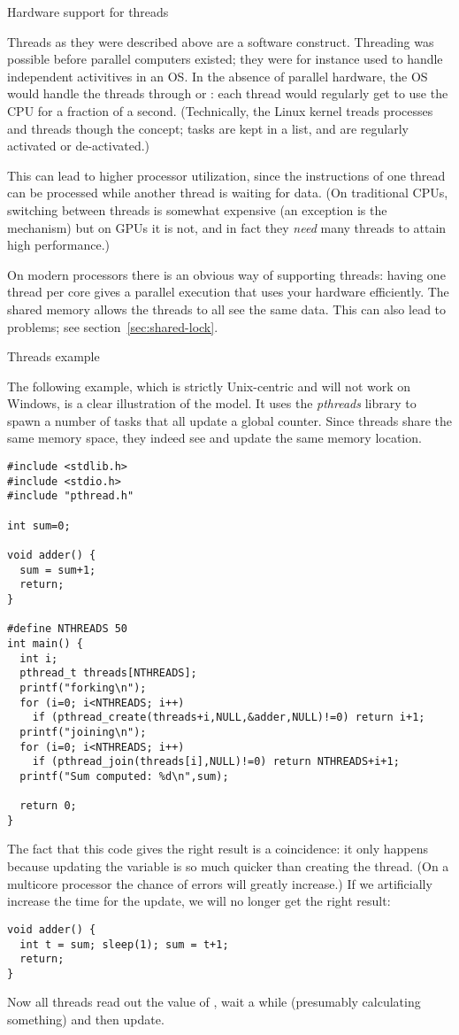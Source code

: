  {Hardware support for threads}

Threads as they were described above are a software
construct. Threading was possible before parallel computers existed;
they were for instance used to handle independent activitives in an
\ac{OS}.
In the absence of parallel hardware, the \ac{OS} would handle
the threads through  or : each thread would regularly get to use the \ac{CPU} for a
fraction of a second. (Technically, the Linux kernel treads processes
and threads though the  concept; tasks are kept in
a list, and are regularly activated or de-activated.)

This can lead to higher processor utilization,
since the instructions of one thread can be processed
while another thread is waiting for data.
(On traditional CPUs,
switching between threads is somewhat expensive (an exception is the
 mechanism) but on \acp{GPU} it is not, and
in fact they \emph{need} many threads to attain high performance.)

On modern  processors there is an obvious way of
supporting threads: having one thread per core gives a parallel
execution that uses your hardware efficiently. The shared memory allows the threads to all
see the same data. This can also lead to problems; see
section~\ref{sec:shared-lock}.

 {Threads example}
\label{sec:thread-example}

The following example,
which is strictly Unix-centric and will not work on Windows,
is a clear illustration of the  model.
It uses the \emph{pthreads} library to spawn
a number of tasks that all update a global counter. Since threads
share the same memory space, they indeed see and update the same
memory location.
\begin{verbatim}
#include <stdlib.h>
#include <stdio.h>
#include "pthread.h"

int sum=0;

void adder() {
  sum = sum+1;
  return;
}

#define NTHREADS 50
int main() {
  int i;
  pthread_t threads[NTHREADS];
  printf("forking\n");
  for (i=0; i<NTHREADS; i++)
    if (pthread_create(threads+i,NULL,&adder,NULL)!=0) return i+1;
  printf("joining\n");
  for (i=0; i<NTHREADS; i++)
    if (pthread_join(threads[i],NULL)!=0) return NTHREADS+i+1;
  printf("Sum computed: %d\n",sum);

  return 0;
}
\end{verbatim}
The fact that this code gives the right result is a
coincidence: it
only happens because updating the variable is so much quicker than
creating the thread. (On a multicore processor the chance of errors
will greatly increase.) If we artificially increase the time for the
update, we will no longer get the right result:
\begin{verbatim}
void adder() {
  int t = sum; sleep(1); sum = t+1;
  return;
}
\end{verbatim}
Now all threads read out the value of , wait a while
(presumably calculating something) and then update.

